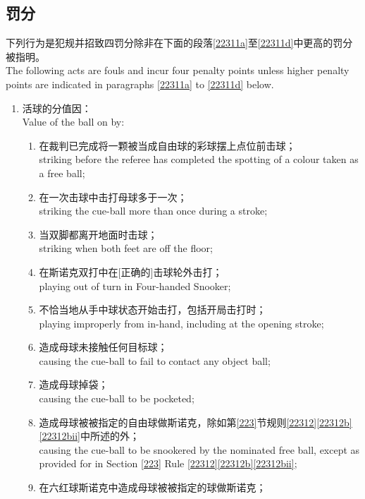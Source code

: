 \subsection{罚分}\label{22311}

\noindent 下列行为是犯规并招致四罚分除非在下面的段落\ref{22311a}至\ref{22311d}中更高的罚分被指明。\\
The following acts are fouls and incur four penalty points unless higher penalty points are indicated in paragraphs \ref{22311a} to \ref{22311d} below.
\begin{enumerate}[label=(\alph*),start=1]
    \item \label{22311a}活球的分值因：\\
    Value of the ball on by:
    \begin{enumerate}[label=(\roman*)]
        \item \label{22311ai}在裁判已完成将一颗被当成自由球的彩球摆上点位前击球；\\
        striking before the referee has completed the spotting of a colour taken as a free ball;
        \item 在一次击球中击打母球多于一次；\\
        striking the cue-ball more than once during a stroke;
        \item \label{22311aiii}当双脚都离开地面时击球；\\
        striking when both feet are off the floor;
        \item 在斯诺克双打中在[正确的]击球轮外击打；\\
        playing out of turn in Four-handed Snooker;
        \item 不恰当地从手中球状态开始击打，包括开局击打时；\\
        playing improperly from in-hand, including at the opening stroke;
        \item 造成母球未接触任何目标球；\\
        causing the cue-ball to fail to contact any object ball;
        \item 造成母球掉袋；\\
        causing the cue-ball to be pocketed;
        \item 造成母球被被指定的自由球做斯诺克，除如第\ref{223}节规则\ref{22312}\ref{22312b}\ref{22312bii}中所述的外；\\
        causing the cue-ball to be snookered by the nominated free ball, except as provided for in Section \ref{223} Rule \ref{22312}\ref{22312b}\ref{22312bii};
        \item 在六红球斯诺克中造成母球被被指定的球做斯诺克；\\

\end{enumerate}
\end{enumerate}

